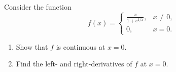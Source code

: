 \begingroup
\renewcommand{\labelenumi}{(\roman{enumi})}
\begin{exercise}
  \label{ex:hw07:one-sided-derivatives}
  Consider the function
  \[
    f(x)=\begin{cases}
      \displaystyle\frac{x}{1+e^{1/x}},&x\ne0,\\[4pt]
      0,&x=0.
    \end{cases}
  \]
  \begin{enumerate}
    \item Show that $f$ is continuous at $x=0$.
    \item Find the left- and right-derivatives of $f$ at $x=0$.
  \end{enumerate}
\end{exercise}
\endgroup
